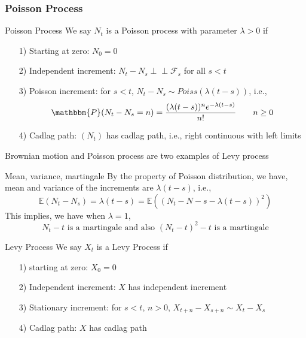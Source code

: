 \documentclass[12pt,a4paper]{article}
\newcommand{\E}{\mathbb{E}}
\newcommand{\indep}{\perp\!\!\!\perp}
\begin{document}
\subsubsection{Poisson Process}
\begin{definition}{Poisson Process}{}
    We say $N_t$ is a Poisson process with parameter $\lambda>0$ if
    \begin{enumerate}
        \item[1)] Starting at zero: $N_0= 0$
        \item[2)] Independent increment: $N_t-N_s\indep \mathscr{F}_s$ for all $s<t$
        \item[3)] Poisson increment: for $s<t$, $N_t-N_s\sim Poiss(\lambda(t-s))$, i.e.,
        $$
        \mathbbm{P}(N_t-N_s= n) = \frac{(\lambda(t-s))^n e^{-\lambda(t-s)}}{n!}\qquad n\ge 0
        $$
        \item[4)]Cadlag path: $(N_t)$ has cadlag path, i.e., right continuous with left limits
    \end{enumerate}
\end{definition}
\begin{remark}{}{}
    Brownian motion and Poisson process are two examples of Levy process
\end{remark}
\begin{remark}{Mean, variance, martingale}{}
    By the property of Poisson distribution, we have, mean and variance of the increments are $\lambda(t-s)$, i.e.,
    $$
    \E(N_t-N_s) = \lambda(t-s) = \E((N_t-N-s-\lambda(t-s))^2)
    $$
    This implies, we have when $\lambda=1$, 
    $$
    N_t-t \text{ is a martingale and also $(N_t-t)^2-t$ is a martingale}
    $$
\end{remark}
\begin{definition}{Levy Process}{}
    We say $X_t$ is a Levy Process if
    \begin{enumerate}
        \item[1)] starting at zero: $X_0=0$
        \item[2)] Independent increment: $X$ has independent increment
        \item[3)] Stationary increment: for $s<t$, $n>0$, $X_{t+n}-X_{s+n}\sim X_t-X_s$
        \item[4)] Cadlag path: $X$ has cadlag path
    \end{enumerate}
\end{definition}
\pagebreak
\end{document}
